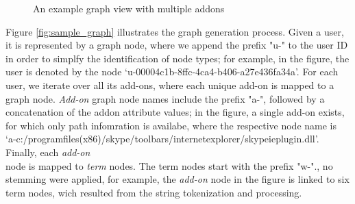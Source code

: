 \documentclass[11pt,oneside]{book}
\begin{document}
\begin{figure}
    \caption{An example graph view with multiple addons}
    \label{fig:sample_graph2}
  \end{figure}
  
Figure \ref{fig:sample_graph} illustrates the graph generation process. Given a user, it is represented by a graph node, where we append the prefix "u-" to the user ID in order to simplfy the identification of node types; for example, in the figure, the user is denoted by the node `u-00004c1b-8ffc-4ca4-b406-a27e436fa34a'. For each user, we iterate over all its add-ons, where each unique add-on is mapped to a graph node. {\it Add-on} graph node names include the prefix "a-", followed by a concatenation of the addon attribute values; in the figure, a single add-on exists, for which only path infomration is availabe, where the respective node name is\\
`a-c:/programfiles(x86)/skype/toolbars/internetexplorer/skypeieplugin.dll'. Finally, each {\it add-on} \\
node is mapped to {\it term} nodes. The term nodes start with the prefix "w-"., no stemming were applied, for example, the {\it add-on} node in the figure is linked to six term nodes, wich resulted from the string tokenization and processing. 
  
\end{document}
